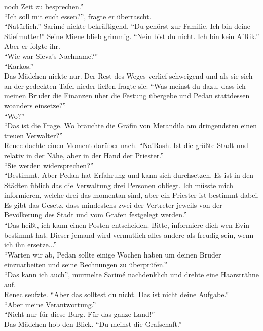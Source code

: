 noch Zeit zu besprechen.''\\
``Ich soll mit euch essen?'', fragte er überrascht.\\
``Natürlich.'' Sarimé nickte bekräftigend. ``Du gehörst zur Familie. Ich bin deine Stiefmutter!''
Seine Miene blieb grimmig. ``Nein bist du nicht. Ich bin kein A'Rik.''\\
Aber er folgte ihr.\\
``Wie war Sieva's Nachname?''\\
``Karkos.''\\
Das Mädchen nickte nur. Der Rest des Weges verlief schweigend und als sie sich an der gedeckten 
Tafel nieder ließen fragte sie: ``Was meinst du dazu, dass ich meinen Bruder die Finanzen über die 
Festung übergebe und Pedan stattdessen woanders einsetze?''\\
``Wo?''\\
``Das ist die Frage. Wo bräuchte die Gräfin von Merandila am dringendsten einen treuen 
Verwalter?''\\
Renec dachte einen Moment darüber nach. ``Na'Rash. Ist die größte Stadt und relativ in der Nähe, 
aber in der Hand der Priester.''\\
``Sie werden widersprechen?'' \\
``Bestimmt. Aber Pedan hat Erfahrung und kann sich durchsetzen. Es ist in den Städten üblich das 
die Verwaltung drei Personen obliegt. Ich müsste mich informieren, welche drei das momentan sind, 
aber ein Priester ist bestimmt dabei. Es gibt das Gesetz, dass mindestens zwei der Vertreter 
jeweils von der Bevölkerung des Stadt und vom Grafen festgelegt werden.''\\
``Das heißt, ich kann einen Posten entscheiden. Bitte, informiere dich wen Evin bestimmt hat. 
Dieser jemand wird vermutlich alles andere als freudig sein, wenn ich ihn ersetze...''\\
``Warten wir ab, Pedan sollte einige Wochen haben um deinen Bruder einzuarbeiten und seine 
Rechnungen zu überprüfen.''\\
``Das kann ich auch'', murmelte Sarimé nachdenklich und drehte eine Haarsträhne auf.\\
Renec seufzte. ``Aber das solltest du nicht. Das ist nicht deine Aufgabe.''\\
``Aber meine Verantwortung.''\\
``Nicht nur für diese Burg. Für das ganze Land!''\\
Das Mädchen hob den Blick. ``Du meinst die Grafschaft.''\\
